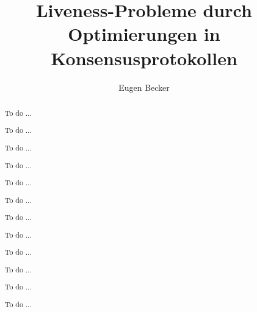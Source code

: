 \documentclass[nonacm,sigconf,natbib=false]{acmart}
\begin{document}
\title{Liveness-Probleme durch Optimierungen in Konsensusprotokollen} %

\author{Eugen Becker}

\renewcommand{\shortauthors}{Eugen Becker}

\renewcommand{\abstractname}{Kurzfassung}

\renewcommand{\refname}{Bibliographie}

\begin{abstract}
  To do ...

  To do ...

  To do ...

  To do ...

  To do ...

  To do ...

  To do ...

  To do ...

  To do ...

  To do ...

  To do ...

  To do ...
\end{abstract}


\maketitle
\end{document}
